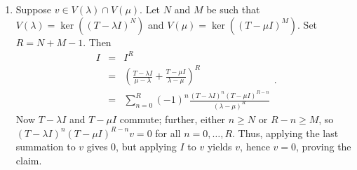\documentclass{article}
\begin{document}
\begin{enumerate}
\begin{enumerate}
\item Suppose \(v \in V(\lambda) \cap V(\mu)\).  Let \(N\) and \(M\) be such that \(V(\lambda) = \ker((T - \lambda I)^N)\) and \(V(\mu) = \ker((T - \mu I)^M)\).  Set \(R = N + M - 1\).  Then
\[\begin{array}{rcl}
  I & = & I^R \\
    & = & \left( \frac{T - \lambda I}{\mu - \lambda} + \frac{T - \mu I}{\lambda - \mu} \right)^R \\
    & = & \sum_{n = 0}^R (-1)^n \frac{(T - \lambda I)^n (T - \mu I)^{R - n}}{(\lambda - \mu)^R}
  \end{array}.\]
Now \(T - \lambda I\) and \(T - \mu I\) commute; further, either \(n \geq N\) or \(R - n \geq M\), so \((T - \lambda I)^n (T - \mu I)^{R - n} v = 0\) for all \(n = 0, \ldots, R\).  Thus, applying the last summation to \(v\) gives \(0\), but applying \(I\) to \(v\) yields \(v\), hence \(v = 0\), proving the claim.
    

\end{enumerate}



\end{enumerate}
\end{document}
